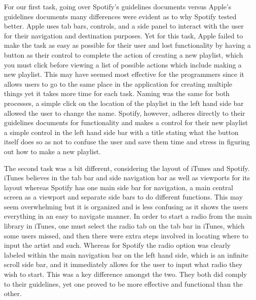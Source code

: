 \documentclass[a4paper]{article}
\begin{document}
For our first task, going over Spotify's guidelines documents versus Apple's guidelines documents many differences were evident as to why Spotify tested better.
Apple uses tab bars, controls, and a side panel to interact with the user for their navigation and destination purposes. Yet for this task, Apple failed to make the task as easy as possible for their user and lost functionality by having a button as their control to complete the action of creating a new playlist, which you must click before viewing a list of possible actions which include making a new playlist. This may have seemed most effective for the programmers since it allows users to go to the same place in the application for creating multiple things yet it takes more time for each task. Naming was the same for both processes, a simple click on the location of the playlist in the left hand side bar allowed the user to change the name. Spotify, however, adheres  directly to their guidelines documents for functionality and makes a control for their new playlist a simple control in the left hand side bar with a title stating what the button itself does so as not to confuse the user and save them time and stress in figuring out how to make a new playlist. 

The second task was a bit different, considering the layout of iTunes and Spotify. iTunes believes in the tab bar and side navigation bar as well as viewports for its layout whereas Spotify has one main side bar for navigation, a main central screen as a viewport and separate side bars to do different functions. This may seem overwhelming but it is organized and is less confusing as it shows the users everything in an easy to navigate manner. In order to start a radio from the main library in iTunes, one must select the radio tab on the tab bar in iTunes, which some users missed, and then there were extra steps involved in locating where to input the artist and such. Whereas for Spotify the radio option was clearly labeled within the main navigation bar on the left hand side, which is an infinite scroll side bar, and it immediately allows for the user to input what radio they wish to start. This was a key difference amongst the two. They both did comply to their guidelines, yet one proved to be more effective and functional than the other.
\end{document}
